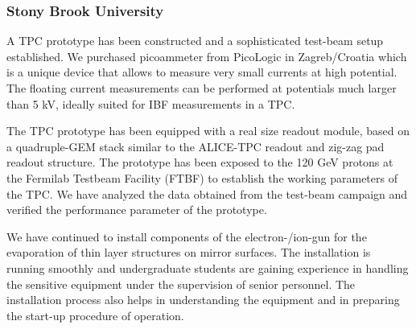 \subsubsection{Stony Brook University}  
A TPC prototype has been constructed and a sophisticated test-beam setup established. We purchased picoammeter from PicoLogic in Zagreb/Croatia which is a unique device that allows to measure very small currents at high potential. The floating current measurements can be performed at potentials much larger than 5 kV, ideally suited for IBF measurements in a TPC.

The TPC prototype has been equipped with a real size readout module, based on a quadruple-GEM stack similar to the ALICE-TPC readout and zig-zag pad readout structure. The prototype has been exposed to the 120 GeV protons at the Fermilab Testbeam Facility (FTBF) to establish the working parameters of the TPC. We have analyzed the data obtained from the test-beam campaign and verified the performance parameter of the prototype.

We have continued to install components of the electron-/ion-gun for the evaporation of thin layer structures on mirror surfaces. The installation is running smoothly and undergraduate students are gaining experience in handling the sensitive equipment under the supervision of senior personnel. The installation process also helps in understanding the equipment and in preparing the start-up procedure of operation.

